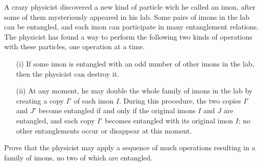A crazy physicist discovered a new kind of particle wich he called an imon, after some of them mysteriously appeared in his lab. Some pairs of imons in the lab can be entangled, and each imon can participate in many entanglement relations. The physicist has found a way to perform the following two kinds of operations with these particles, one operation at a time.

\begin{itemize}

\item[(i)] If some imon is entangled with an odd number of other imons in the lab, then the physicist can destroy it.


\item[(ii)] At any moment, he may double the whole family of imons in the lab by creating a copy 
$I'$
 of each imon 
$I$.
 During this procedure, the two copies 
$I'$
 and 
$J'$
 become entangled if and only if the original imons 
$I$
 and 
$J$
 are entangled, and each copy 
$I'$
 becomes entangled with its original imon 
$I$;
 no other entanglements occur or disappear at this moment.

\end{itemize}

Prove that the physicist may apply a sequence of much operations resulting in a family of imons, no two of which are entangled.
